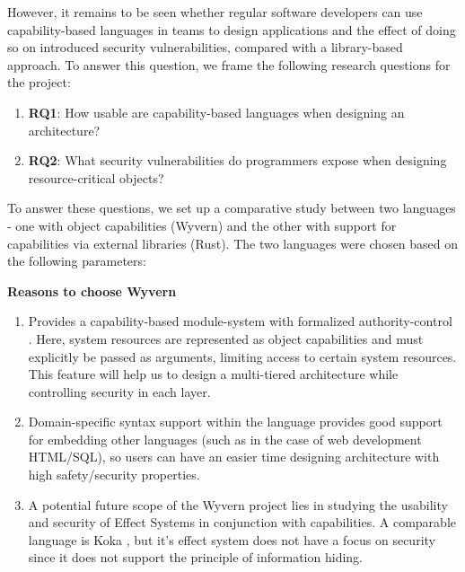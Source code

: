 However, it remains to be seen whether regular software developers can use capability-based languages in teams to design applications and the effect of doing so on introduced security vulnerabilities, compared with a library-based approach. To answer this question, we frame the following research questions for the project:

\begin{enumerate}
    \item \textbf{RQ1}: How usable are capability-based languages when designing an architecture?
    \item \textbf{RQ2}: What security vulnerabilities do programmers expose when designing resource-critical objects?  
\end{enumerate}

To answer these questions, we set up a comparative study between two languages - one with object capabilities (Wyvern) and the other with support for capabilities via external libraries (Rust). The two languages were chosen based on the following parameters:

\noindent
\textbf{Reasons to choose Wyvern}
\begin{enumerate}
    \item Provides a capability-based module-system with formalized authority-control \cite{DBLP:journals/darts/MelicherSPA17}. Here, system resources are represented as object capabilities and must explicitly be passed as arguments, limiting access to certain system resources. This feature will help us to design a multi-tiered architecture while controlling security in each layer.
    \item Domain-specific syntax support within the language provides good support for embedding other languages (such as in the case of web development HTML/SQL), so users can have an easier time designing architecture with high safety/security properties.
    \item A potential future scope of the Wyvern project lies in studying the usability and security of Effect Systems in conjunction with capabilities. A comparable language is Koka \cite{leijen2014koka}, but it's effect system does not have a focus on security since it does not support the principle of information hiding. 
\end{enumerate}


